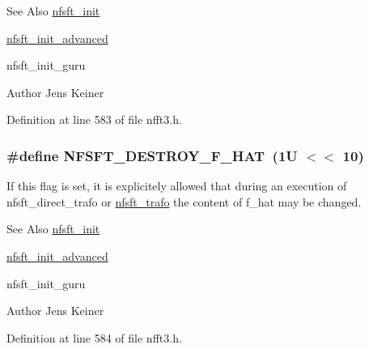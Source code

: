 \begin{DoxySeeAlso}{See Also}
\hyperlink{group__nfsft_ga65cda3f4a3edc5eb39c697cf34b1f0b9}{nfsft\-\_\-init} 

\hyperlink{group__nfsft_ga2812aa5beba0eb7efd3072bf323a0155}{nfsft\-\_\-init\-\_\-advanced} 

nfsft\-\_\-init\-\_\-guru 
\end{DoxySeeAlso}
\begin{DoxyAuthor}{Author}
Jens Keiner 
\end{DoxyAuthor}


Definition at line 583 of file nfft3.\-h.

\hypertarget{group__nfsft_gaa808899fc4db422c7b23470e6baad904}{
\subsubsection[{N\-F\-S\-F\-T\-\_\-\-D\-E\-S\-T\-R\-O\-Y\-\_\-\-F\-\_\-\-H\-A\-T}]{\setlength{\rightskip}{0pt plus 5cm}\#define N\-F\-S\-F\-T\-\_\-\-D\-E\-S\-T\-R\-O\-Y\-\_\-\-F\-\_\-\-H\-A\-T~(1\-U $<$$<$ 10)}}\label{group__nfsft_gaa808899fc4db422c7b23470e6baad904}
If this flag is set, it is explicitely allowed that during an execution of nfsft\-\_\-direct\-\_\-trafo or \hyperlink{group__nfsft_ga5796fc68c432d46dfcab7abd8c56ee22}{nfsft\-\_\-trafo} the content of {\ttfamily f\-\_\-hat} may be changed.

\begin{DoxySeeAlso}{See Also}
\hyperlink{group__nfsft_ga65cda3f4a3edc5eb39c697cf34b1f0b9}{nfsft\-\_\-init} 

\hyperlink{group__nfsft_ga2812aa5beba0eb7efd3072bf323a0155}{nfsft\-\_\-init\-\_\-advanced} 

nfsft\-\_\-init\-\_\-guru 
\end{DoxySeeAlso}
\begin{DoxyAuthor}{Author}
Jens Keiner 
\end{DoxyAuthor}


Definition at line 584 of file nfft3.\-h.

